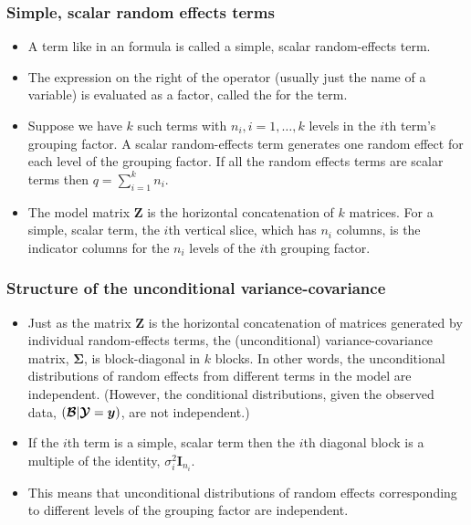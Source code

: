 \begin{frame}
  \frametitle{Simple, scalar random effects terms}
  \begin{itemize}
  \item A term like  in an  formula is
    called a simple, scalar random-effects term.
  \item The expression on the right of the  operator
    (usually just the name of a variable) is evaluated as a factor,
    called the  for the term.
  \item Suppose we have $k$ such terms with $n_i,i=1,\dots,k$ levels
    in the $i$th term's grouping factor. A scalar random-effects term
    generates one random effect for each level of the grouping factor.
    If all the random effects terms are scalar terms then
    $q=\sum_{i=1}^kn_i$.
  \item The model matrix $\bm Z$ is the horizontal concatenation of $k$
    matrices.  For a simple, scalar term, the $i$th vertical slice,
    which has $n_i$ columns, is the indicator columns for the $n_i$
    levels of the $i$th grouping factor.
  \end{itemize}
\end{frame}

\begin{frame}
  \frametitle{Structure of the unconditional variance-covariance}
  \begin{itemize}
  \item Just as the matrix $\bm Z$ is the horizontal concatenation of
    matrices generated by individual random-effects terms, the
    (unconditional) variance-covariance matrix, $\bm\Sigma$, is
    block-diagonal in $k$ blocks.  In other words, the unconditional
    distributions of random effects from different terms in the model
    are independent.  (However, the conditional distributions, given
    the observed data, $(\bm{\mathcal{B}}|\bm{\mathcal{Y}}=\bm y)$, are not independent.)
  \item If the $i$th term is a simple, scalar term then the $i$th
    diagonal block is a multiple of the identity, $\sigma_i^2\bm I_{n_i}$.
  \item This means that unconditional distributions of random effects
    corresponding to different levels of the grouping factor are
    independent.
  \end{itemize}
\end{frame}

